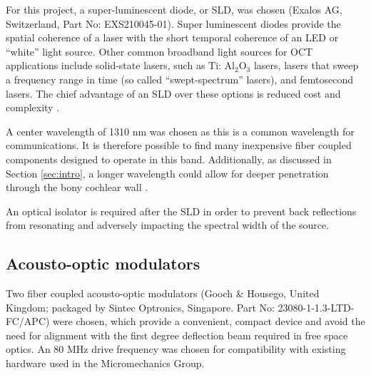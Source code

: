 For this project,  a super-luminescent diode, or SLD, was chosen (Exalos AG, Switzerland, Part No: EXS210045-01). Super luminescent diodes provide the spatial coherence of a laser with the short temporal coherence of an LED or ``white'' light source. Other common broadband light sources for OCT applications include solid-state lasers, such as Ti: Al$_2$O$_3$ lasers, lasers that sweep a frequency range in time (so called ``swept-spectrum'' lasers), and femtosecond lasers. The chief advantage of an SLD over these options is reduced cost and complexity \cite{bouma}.

A center wavelength of 1310 nm was chosen as this is a common wavelength for communications. It is therefore possible to find many inexpensive fiber coupled components designed to operate in this band. Additionally, as discussed in Section \ref{sec:intro}, a longer wavelength could allow for deeper penetration through the bony cochlear wall \cite{Sandell2011} \cite{Bashkatov2006}.

An optical isolator is required after the SLD in order to prevent back reflections from resonating and adversely impacting the spectral width of the source.


\subsection{Acousto-optic modulators}

Two fiber coupled acousto-optic modulators (Gooch \& Housego, United Kingdom; packaged by Sintec Optronics, Singapore. Part No: 23080-1-1.3-LTD-FC/APC) were chosen, which provide a convenient, compact device and avoid the need for alignment with the first degree deflection beam required in free space optics. An 80 MHz drive frequency was chosen for compatibility with existing hardware used in the Micromechanics Group. %

